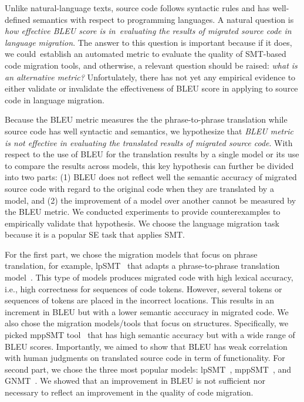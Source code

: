Unlike natural-language texts, source code follows syntactic rules and
has well-defined semantics with respect to programming languages. A
natural question is {\em how effective BLEU score is in~evaluating the
  results of migrated source code in language migration}. The answer
to this question is important because if it does, we could~establish
an automated metric to evaluate the quality of SMT-based code
migration tools, and otherwise, a relevant question should be raised:
{\em what is an alternative metric?} Unfortulately, there has not yet
any empirical evidence to either validate or invalidate the
effectiveness of BLEU score in applying to source code in language
migration.

Because the BLEU metric measures the the phrase-to-phrase translation
while source code has well syntactic and semantics, we hypothesize
that {\em BLEU metric is not effective in evaluating the translated
  results of migrated source code}. With respect to the use of BLEU
for the translation results by a single model or its use to compare
the results across models, this key hypothesis can further be divided
into two parts: (1) BLEU does not reflect well the semantic accuracy
of migrated source code with regard to the original code when they are
translated by a model, and (2) the improvement of a model over another
cannot be measured by the BLEU metric.
%
We conducted experiments to provide counterexamples to empirically
validate that hypothesis. We choose the language migration task
because it is a popular SE task that applies SMT. 

For the first part, we chose the migration models that focus on phrase
translation, for example, lpSMT~\cite{fse13-nier} that adapts a
phrase-to-phrase translation model~\cite{phrasal10}. This type of
models produces migrated code with high lexical accuracy, i.e., high
correctness for sequences of code tokens. However, several tokens or
sequences of tokens are placed in the incorrect locations.  This
results in an increment in BLEU but with a lower semantic acccuracy in
migrated code. We also chose the migration models/tools that focus on
structures. Specifically, we picked mppSMT tool~\cite{ase15} that has
high semantic accuracy but with a wide range of BLEU
scores. Importantly, we aimed to show that BLEU has weak correlation
with human judgments on translated source code in term of
functionality. For second part, we chose the three most popular
models: lpSMT~\cite{fse13-nier}, mppSMT~\cite{ase15}, and
GNMT~\cite{tien}. We showed that an improvement in BLEU is not
sufficient nor necessary to reflect an improvement in the quality of
code migration.

